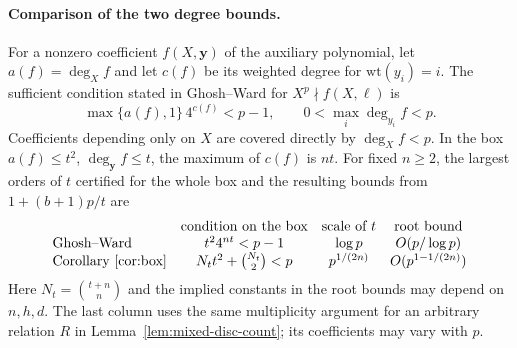\paragraph{Comparison of the two degree bounds.}
For a nonzero coefficient $f(X,\boldsymbol y)$ of the auxiliary polynomial,
let $a(f)=\deg_X f$ and let $c(f)$ be its weighted degree for
$\mathrm{wt}(y_i)=i$. The sufficient condition stated in
Ghosh--Ward \cite[\S3, Lemma~3]{GW} for $X^p\nmid f(X,\boldsymbol\ell)$ is
\[
  \max\{a(f),1\}\,4^{c(f)}<p-1,\qquad
  0<\max_i\deg_{y_i} f<p .
\]
Coefficients depending only on $X$ are covered directly by $\deg_X f<p$.
In the box $a(f)\le t^2$, $\deg_{\boldsymbol y}f\le t$, the maximum of
$c(f)$ is $nt$. For fixed $n\ge2$, the largest orders of $t$ certified
for the whole box and the resulting bounds from $1+(b+1)p/t$ are
\[
\begin{array}{lccc}
 & \text{condition on the box} & \text{scale of }t & \text{root bound} \\
 \text{Ghosh--Ward} & t^2 4^{nt}<p-1 & \log p & O(p/\log p) \\
 \text{Corollary~\ref{cor:box}} & N_t t^2+\binom{N_t}{2}<p
     & p^{1/(2n)} & O(p^{1-1/(2n)})
\end{array}
\]
Here $N_t=\binom{t+n}{n}$ and the implied constants in the root bounds
may depend on $n,h,d$. The last column uses the same multiplicity
argument for an arbitrary relation $R$ in Lemma~\ref{lem:mixed-disc-count};
its coefficients may vary with $p$.

